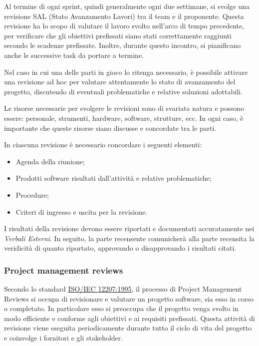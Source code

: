 Al termine di ogni sprint, quindi generalmente ogni due settimane, si svolge una revisione SAL
(Stato Avanzamento Lavori) tra il team e il proponente. Questa revisione ha lo scopo di valutare il lavoro svolto
nell'arco di tempo precedente, per verificare che gli obiettivi prefissati siano stati correttamente raggiunti secondo le scadenze prefissate.
Inoltre, durante questo incontro, si pianificano anche le successive task da portare a termine.

Nel caso in cui una delle parti in gioco lo ritenga necessario, è possibile attivare una revisione ad hoc per valutare attentamente lo stato
di avanzamento del progetto, discutendo di eventuali problematiche e relative soluzioni adottabili.

Le risorse necessarie per svolgere le revisioni sono di svariata natura e possono essere: personale, strumenti, hardware, software, strutture, ecc.
In ogni caso, è importante che queste risorse siano discusse e concordate tra le parti.

In ciascuna revisione è necessario concordare i seguenti elementi:
\begin{itemize}
	\item Agenda della riunione;
	\item Prodotti software risultati dall'attività e relative problematiche;
	\item Procedure;
	\item Criteri di ingresso e uscita per la revisione.
\end{itemize}

I risultati della revisione devono essere riportati e documentati accuratamente nei \textit{Verbali Esterni}. In seguito, la parte recensente
comunicherà alla parte recensita la veridicità di quanto riportato, approvando o disapprovando i risultati citati.

\subsubsection{Project management reviews}
Secondo lo standard \href{https://www.math.unipd.it/~tullio/IS-1/2009/Approfondimenti/ISO_12207-1995.pdf}{\underline{ISO/IEC 12207:1995}},
il processo di Project Management Reviews si occupa di revisionare e valutare un progetto software, sia esso
in corso o completato. In particolare esso si preoccupa che il progetto venga svolto in modo efficiente e conforme agli obiettivi e ai requisiti
prefissati. Questa attività di revisione viene eseguita periodicamente durante tutto il ciclo di vita del progetto e
coinvolge i fornitori e gli stakeholder.

